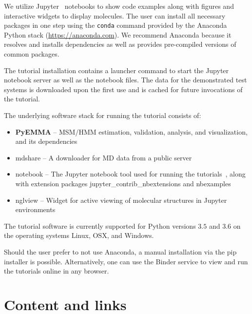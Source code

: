 \documentclass[9pt,tutorial]{livecoms}
\begin{document}
We utilize Jupyter~\cite{jupyter} notebooks to show code examples along with figures and interactive widgets to display molecules.
The user can install all necessary packages in one step using the \texttt{conda} command provided by the Anaconda Python stack (\url{https://anaconda.com}).
We recommend Anaconda because it resolves and installs dependencies as well as provides pre-compiled versions of common packages.

The tutorial installation contains a launcher command to start the Jupyter notebook server as well as the notebook files.
The data for the demonstrated test systems is downloaded upon the first use and is cached for future invocations of the tutorial.

The underlying software stack for running the tutorial consists of:
\begin{itemize}
\item \textbf{PyEMMA} -- MSM/HMM estimation, validation, analysis, and visualization, and its dependencies~\cite{pyemma}
\item mdshare -- A downloader for MD data from a public server
\item notebook -- The Jupyter notebook tool used for running the tutorials~\cite{jupyter}, along with extension packages jupyter\_contrib\_nbextensions and nbexamples
\item nglview -- Widget for active viewing of molecular structures in Jupyter environments~\cite{nguyen2017nglview}
\end{itemize}

The tutorial software is currently supported for Python versions $3.5$ and $3.6$ on the operating systems Linux, OSX, and Windows.

Should the user prefer to not use Anaconda, a manual installation via the pip installer is possible.
Alternatively, one can use the Binder service to view and run the tutorials online in any browser.

\section{Content and links}
\end{document}

